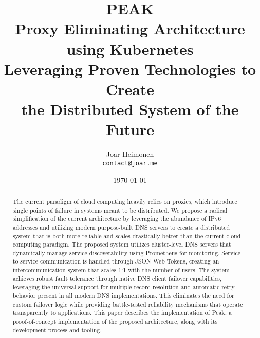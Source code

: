 \documentclass[12pt]{article}
\author{
    Joar Heimonen\\
    \texttt{contact@joar.me}
}
\title{
    \textbf{PEAK}\\[0.5em]
    \large \textbf{P}roxy \textbf{E}liminating \textbf{A}rchitecture using \textbf{K}ubernetes\\[0.3em]
    \large Leveraging Proven Technologies to Create\\
    the Distributed System of the Future
}
\date{\today}
\begin{document}
\maketitle

\begin{abstract}
    The current paradigm of cloud computing heavily relies on proxies, which introduce single points of failure in systems meant to be distributed. 
    We propose a radical simplification of the current architecture by leveraging the abundance of IPv6 addresses and utilizing modern purpose-built 
    DNS servers to create a distributed system that is both more reliable and scales drastically better than the current cloud computing paradigm. 
    The proposed system utilizes cluster-level DNS servers that dynamically manage service discoverability using Prometheus for monitoring. 
    Service-to-service communication is handled through JSON Web Tokens, creating an intercommunication system that scales 1:1 with the number of users. 
    The system achieves robust fault tolerance through native DNS client failover capabilities, leveraging the universal support for multiple 
    record resolution and automatic retry behavior present in all modern DNS implementations. 
    This eliminates the need for custom failover logic while providing battle-tested reliability mechanisms that operate transparently to applications. 
    This paper describes the implementation of Peak, a proof-of-concept implementation of the proposed architecture, along with its development process and tooling.
\end{abstract}

\pagebreak

\tableofcontents

\pagebreak
\end{document}
